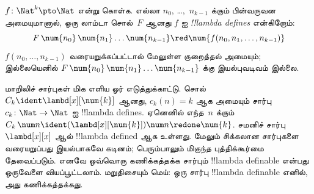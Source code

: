 \documentclass[../../../include/open-logic-section]{subfiles}
\begin{document}
\begin{defn}
$f\colon \Nat^k \pto \Nat$ என்று கொள்க. எல்லா
$n_0$, \dots,~$n_{k-1}$ க்கும் பின்வருவன அமையுமானால், ஒரு லாம்டா சொல்~$F$
ஆனது $f$ ஐ \emph{!!{lambda define}s} என்கிறோம்:
\[
F \, \num{n_0} \, \num{n_1} \dots \num{n_{k-1}} \red \num{f(n_0, n_1, \dots,
  n_{k-1})}
\]
$f(n_0, \dots, n_{k-1})$ வரையறுக்கப்பட்டால் மேலுள்ள குறைத்தல் அமையும்;
இல்லையெனில் $F \, \num{n_0} \,
\num{n_1} \dots \num{n_{k-1}}$ க்கு இயல்புவடிவம் இல்லை.
\end{defn}

மாறிலிச் சார்புகள் மிக எளிய ஓர் எடுத்துக்காட்டு. சொல் $C_k \ident
\lambd[x][\num{k}]$ ஆனது, $c_k(n) = k$ ஆக அமையும் சார்பு
$c_k\colon \Nat \to \Nat$ ஐ !!{lambda define}s.
ஏனெனில் எந்த~$n$ க்கும் $C_k \, \num n \ident
(\lambd[x][\num{k}])\num n \redone \num{k}$. சமனிச் சார்பு
$\lambd[x][x]$ ஆல் !!{lambda defined} ஆக உள்ளது. மேலும் சிக்கலான சார்புகளை
வரையறுப்பது இயல்பாகவே கடினம்; பெரும்பாலும் மிகுந்த புத்திக்கூர்மை தேவைப்படும்.
எனவே ஒவ்வொரு கணிக்கத்தக்க சார்பும் !!{lambda definable} என்பது ஒருவேளை
வியப்பூட்டலாம். மறுதிசையும் மெய்: ஒரு சார்பு !!{lambda definable} எனில்,
அது கணிக்கத்தக்கது.
\end{document}
